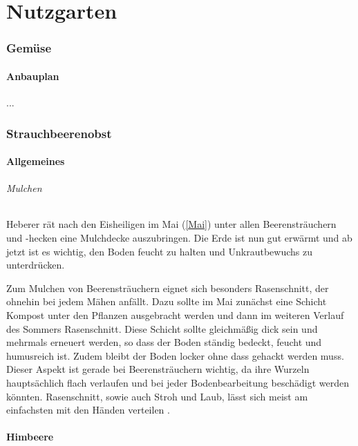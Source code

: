 \part{Nutzgarten}

\pagebreak

\section{Gemüse}

\subsection{Anbauplan}
...

\pagebreak

\section{Strauchbeerenobst}
\label{Strauchbeerenobst}

\subsection{Allgemeines}

\paragraph{Mulchen}

Heberer \cite[S.~44]{Heberer2018} rät nach den Eisheiligen im \textrightarrow Mai (\ref{Mai}) unter allen Beerensträuchern und -hecken eine Mulchdecke auszubringen.
Die Erde ist nun gut erwärmt und ab jetzt ist es wichtig, den Boden feucht zu halten und Unkrautbewuchs zu unterdrücken.

Zum Mulchen von Beerensträuchern eignet sich besonders Rasenschnitt, der ohnehin bei jedem Mähen anfällt.
Dazu sollte im Mai zunächst eine Schicht Kompost unter den Pflanzen ausgebracht werden und dann im weiteren Verlauf des Sommers Rasenschnitt.
Diese Schicht sollte gleichmäßig dick sein und mehrmals erneuert werden, so dass der Boden ständig bedeckt, feucht und humusreich ist.
Zudem bleibt der Boden locker ohne dass gehackt werden muss.
Dieser Aspekt ist gerade bei Beerensträuchern wichtig, da ihre Wurzeln hauptsächlich flach verlaufen und bei jeder Bodenbearbeitung beschädigt werden könnten.
Rasenschnitt, sowie auch Stroh und Laub, lässt sich meist am einfachsten mit den Händen verteilen \cite[S.~45]{Heberer2018}.

\subsection{Himbeere}
\label{Himbeere}

